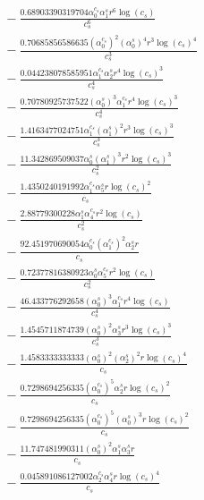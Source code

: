 \documentclass[10pt]{article}
\begin{document}
\begin{align*}
&{}  - \frac{0.68903390319704 \alpha_{0}^{c_s} \alpha_{1}^s r^{6} \log{\left(c_{s} \right)}}{c_{s}^{6}} \\
&{}  - \frac{0.70685856586635 \left(\alpha_{0}^{c_s}\right)^{2} \left(\alpha_{0}^s\right)^{4} r^{3} \log{\left(c_{s} \right)}^{4}}{c_{s}^{3}} \\
&{}  - \frac{0.044238078585951 \alpha_{1}^{c_s} \alpha_{2}^s r^{4} \log{\left(c_{s} \right)}^{3}}{c_{s}^{4}} \\
&{}  - \frac{0.70780925737522 \left(\alpha_{0}^s\right)^{3} \alpha_{1}^{c_s} r^{4} \log{\left(c_{s} \right)}^{3}}{c_{s}^{4}} \\
&{}  - \frac{1.4163477024751 \alpha_{1}^{c_s} \left(\alpha_{1}^s\right)^{2} r^{3} \log{\left(c_{s} \right)}^{3}}{c_{s}^{3}} \\
&{}  - \frac{11.342869509037 \alpha_{0}^s \left(\alpha_{1}^s\right)^{3} r^{2} \log{\left(c_{s} \right)}^{3}}{c_{s}^{2}} \\
&{}  - \frac{1.4350240191992 \alpha_{1}^{c_s} \alpha_{5}^s r \log{\left(c_{s} \right)}^{2}}{c_{s}} \\
&{}  - \frac{2.88779300228 \alpha_{1}^s \alpha_{4}^{c_s} r^{2} \log{\left(c_{s} \right)}}{c_{s}^{2}} \\
&{}  - \frac{92.451970690054 \alpha_{0}^{c_s} \left(\alpha_{1}^{c_s}\right)^{2} \alpha_{2}^s r}{c_{s}} \\
&{}  - \frac{0.72377816380923 \alpha_{0}^s \alpha_{5}^{c_s} r^{2} \log{\left(c_{s} \right)}}{c_{s}^{2}} \\
&{}  - \frac{46.433776292658 \left(\alpha_{0}^s\right)^{3} \alpha_{1}^{c_s} r^{4} \log{\left(c_{s} \right)}}{c_{s}^{4}} \\
&{}  - \frac{1.4545711874739 \left(\alpha_{0}^s\right)^{2} \alpha_{3}^s r^{3} \log{\left(c_{s} \right)}^{3}}{c_{s}^{3}} \\
&{}  - \frac{1.4583333333333 \left(\alpha_{0}^s\right)^{2} \left(\alpha_{2}^s\right)^{2} r \log{\left(c_{s} \right)}^{4}}{c_{s}} \\
&{}  - \frac{0.7298694256335 \left(\alpha_{0}^{c_s}\right)^{5} \alpha_{2}^s r \log{\left(c_{s} \right)}^{2}}{c_{s}} \\
&{}  - \frac{0.7298694256335 \left(\alpha_{0}^{c_s}\right)^{5} \left(\alpha_{0}^s\right)^{3} r \log{\left(c_{s} \right)}^{2}}{c_{s}} \\
&{}  - \frac{11.747481990311 \left(\alpha_{0}^s\right)^{2} \alpha_{1}^s \alpha_{3}^s r}{c_{s}} \\
&{}  - \frac{0.045891086127002 \alpha_{2}^{c_s} \alpha_{4}^s r \log{\left(c_{s} \right)}^{4}}{c_{s}} \\

\end{align*}
\end{document}
